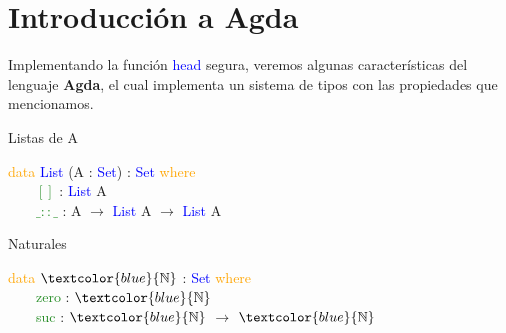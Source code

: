 \documentclass[xcolor=dvipsnames]{beamer} %
\newcommand{\cf}[1]{\textcolor{blue}{#1}}
\newcommand{\ct}[1]{\textcolor{blue}{#1}}
\newcommand{\cc}[1]{\textcolor{ForestGreen}{#1}}
\newcommand{\ck}[1]{\textcolor{orange}{#1}}
\newcommand{\N}{\ct{\mathbb{N}}}
\newcommand{\ra}{\rightarrow}
\newcommand{\T}{ \ \ \ \ }
\begin{document}
\section{Introducción a Agda}

\begin{frame}

\begin{block}{}
Implementando la función \cf{head} segura, veremos algunas características del lenguaje \textbf{Agda}, el
cual implementa un sistema de tipos con las propiedades que mencionamos.
\end{block}

\pause

\begin{block}{Listas de A}

\ck{data} \ct{List} (A : \ct{Set}) : \ct{Set} \ck{where}\\
\T \cc{$[]$} : \ct{List} A\\
\T \cc{$\_::\_$} : A $\ra$ \ct{List} A $\ra$ \ct{List} A

\end{block}

\pause

\begin{block}{Naturales}

\ck{data} $\N$ : \ct{Set} \ck{where}\\
\T \cc{zero} : $\N$\\
\T \cc{suc}  : $\N$ $\ra$ $\N$

\end{block}

\end{frame}
\end{document}
